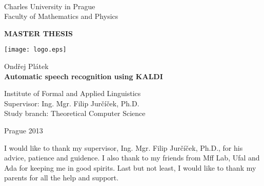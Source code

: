 
\begin{titlepage}
\begin{center}
\ \\

\vspace{15mm}

\large
Charles University in Prague\\
Faculty of Mathematics and Physics\\

\vspace{5mm}

{\Large\bf MASTER THESIS}

\vspace{15mm}

\texttt{[image: logo.eps]} %

\vspace{20mm}
{\Large Ondřej Plátek}\\ 

\vspace{5mm}
{\Large\bf Automatic speech recognition using KALDI}

\vspace{20mm}
\large
\noindent
Institute of Formal and Applied Linguistics\\
\noindent
Supervisor: Ing. Mgr. Filip Jurčíček, Ph.D.\\
\noindent
Study branch: Theoretical Computer Science\\
\end{center}
\vspace{20mm}
\begin{center}
Prague 2013
\end{center}

\end{titlepage} %

\newpage

\normalsize %
\vspace{10mm} 

\noindent I would like to thank my supervisor, Ing. Mgr. Filip Jurčíček, Ph.D., for his advice, patience and guidence. I also thank to my friends from Mff Lab, Ufal and Ada for keeping me in good spirits. Last but not least, I would like to thank my parents for all the help and support.


